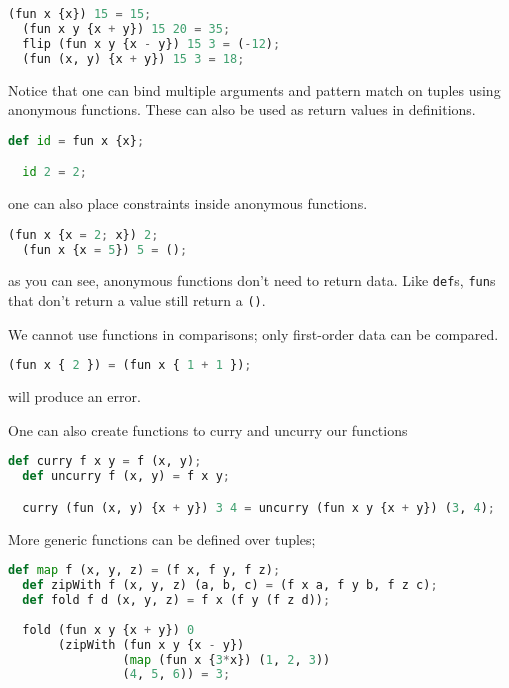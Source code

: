 \begin{lstlisting}[language=Python]
  (fun x {x}) 15 = 15;
  (fun x y {x + y}) 15 20 = 35;
  flip (fun x y {x - y}) 15 3 = (-12);
  (fun (x, y) {x + y}) 15 3 = 18;
\end{lstlisting}

Notice that one can bind multiple arguments and pattern match on tuples using anonymous functions. These can also be used as return values in definitions.

\begin{lstlisting}[language=Python]
  def id = fun x {x};

  id 2 = 2;
\end{lstlisting}

one can also place constraints inside anonymous functions.

\begin{lstlisting}[language=Python]
  (fun x {x = 2; x}) 2;
  (fun x {x = 5}) 5 = ();
\end{lstlisting}

as you can see, anonymous functions don't need to return data. Like \lstinline{def}s, \lstinline{fun}s that don't return a value still return a \lstinline{()}.

We cannot use functions in comparisons; only first-order data can be compared. 

\begin{lstlisting}[language=Python]
  (fun x { 2 }) = (fun x { 1 + 1 });
\end{lstlisting}

will produce an error.

One can also create functions to curry and uncurry our functions

\begin{lstlisting}[language=Python]
  def curry f x y = f (x, y);
  def uncurry f (x, y) = f x y;

  curry (fun (x, y) {x + y}) 3 4 = uncurry (fun x y {x + y}) (3, 4);
\end{lstlisting}

More generic functions can be defined over tuples;

\begin{lstlisting}[language=Python]
  def map f (x, y, z) = (f x, f y, f z);
  def zipWith f (x, y, z) (a, b, c) = (f x a, f y b, f z c);
  def fold f d (x, y, z) = f x (f y (f z d));
  
  fold (fun x y {x + y}) 0
       (zipWith (fun x y {x - y}) 
                (map (fun x {3*x}) (1, 2, 3)) 
                (4, 5, 6)) = 3;
\end{lstlisting}

